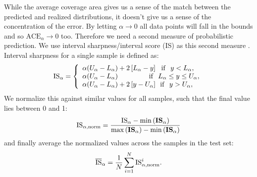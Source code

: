     
While the average coverage area gives us a sense of the match between the predicted and realized distributions, it doesn't give us a sense of the concentration of the error.  By letting $\alpha \rightarrow 0$ all data points will fall in the bounds and so $\mathrm{ACE}_\alpha \rightarrow 0$ too.  Therefore we need a second measure of probabilistic prediction.  We use interval sharpness/interval score (IS) as this second measure \citep{gneiting_metrics, bracher_metrics}. Interval sharpness for a single sample is defined as:
\begin{align*}
    \mathrm{IS}_{\alpha}=\left\{\begin{array}{lll}
 \alpha( U_{\alpha}-L_{\alpha}) + 2\left[L_{\alpha}-y\right] \ \ {\rm if} \ \ y<L_{\alpha}, \\
 \alpha( U_{\alpha}-L_{\alpha}) \hspace{4.5em} {\rm if} \ \ L_{\alpha} \leq y \leq U_{\alpha}, \\
 \alpha( U_{\alpha}-L_{\alpha}) +2\left[y-U_{\alpha}\right] \, \ {\rm if} \ \ y>U_{\alpha}, 
\end{array}
\right.
\end{align*}
We normalize this against similar values for all samples, such that the final value lies between 0 and 1:
\begin{align}
    \mathrm{IS}_{\alpha, \rm{norm}} = \frac{\mathrm{IS}_\alpha - \min{(\mathrm{\mathbf{IS}}_\alpha)}}{\max{(\mathrm{\mathbf{IS}}_\alpha)} - \min{(\mathrm{\mathbf{IS}}_\alpha)}} \nonumber
\end{align}
and finally average the normalized values across the samples in the test set:
\begin{equation}
\overline{\mathrm{IS}}_\alpha = \frac{1}{N} \sum_{i=1}^N \mathrm{IS}_{\alpha, \rm{norm}}^i. \label{eq.defIntSharp}
\end{equation}
